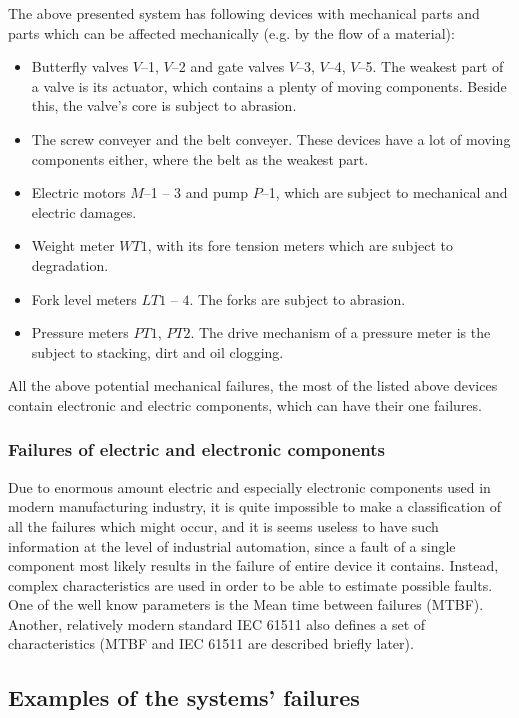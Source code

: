 The above presented system has following devices with mechanical parts and
parts which can be affected mechanically (e.g. by the flow of a material):
\begin{itemize}
  \item Butterfly valves $V$--1, $V$--2 and gate valves $V$--3, $V$--4, $V$--5.
  The weakest part of a valve is its actuator, which contains a plenty of
  moving components. Beside this, the valve's core is subject to abrasion. 
  \item The screw conveyer and the belt conveyer. These devices have a lot of
  moving components either, where the belt as the weakest part.  
  \item Electric motors $M$--1 -- 3 and pump $P$--1, which
  are subject to mechanical and electric damages.
  \item Weight meter $WT1$, with its fore tension meters which are subject to
  degradation.
  \item Fork level meters $LT1$ -- $4$. The forks are subject to abrasion.
  \item Pressure meters $PT1$, $PT2$. The drive mechanism of a pressure meter is
  the subject to stacking, dirt and oil clogging. 
\end{itemize}

All the above potential mechanical failures, the most of the listed above devices
contain electronic and electric components, which can have their one failures. 

\subsubsection{Failures of electric and electronic components}

Due to enormous amount electric and especially electronic components used in
modern manufacturing industry, it is quite impossible to make a classification
of all the failures which might occur, and it is seems useless to have such
information at the level of industrial automation, since a fault of a single
component most likely results in the failure of entire device it contains.
Instead, complex characteristics are used in order to be able to estimate 
possible faults. One of the well know parameters is the Mean time between
failures (MTBF). Another, relatively modern standard IEC 61511 also defines a
set of characteristics (MTBF and IEC 61511 are described briefly later).

\subsection{Examples of the systems' failures}

